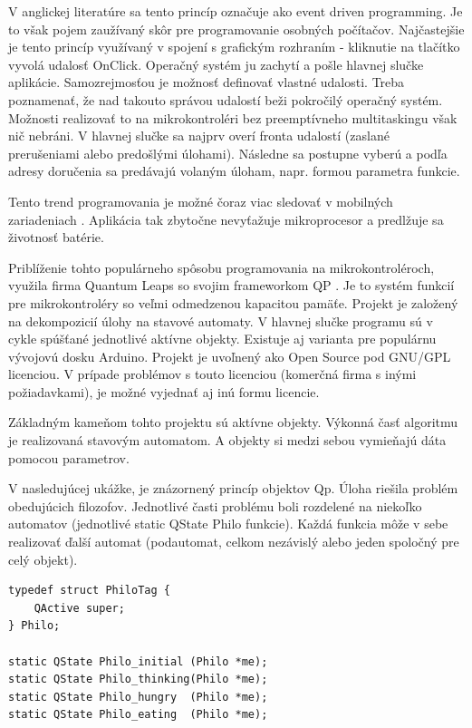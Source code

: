 V anglickej literatúre sa tento princíp označuje ako event driven programming. Je to však pojem zaužívaný skôr pre programovanie osobných počítačov. Najčastejšie je tento princíp využívaný v spojení s grafickým rozhraním - kliknutie na tlačítko vyvolá udalosť OnClick. Operačný systém ju zachytí a pošle hlavnej slučke aplikácie. Samozrejmosťou je možnosť definovať vlastné udalosti. Treba poznamenať, že nad takouto správou udalostí beži pokročilý operačný systém. Možnosti realizovať to na mikrokontroléri bez preemptívneho multitaskingu však nič nebráni. 
V hlavnej slučke sa najprv overí fronta udalostí (zaslané prerušeniami alebo predošlými úlohami). Následne sa postupne vyberú a podľa adresy doručenia sa predávajú volaným úloham, napr. formou parametra funkcie.

Tento trend programovania je možné čoraz viac sledovať v mobilných zariadeniach \cite{android_event}. Aplikácia tak zbytočne nevyťažuje mikroprocesor a predlžuje sa životnosť batérie.

Priblíženie tohto populárneho spôsobu programovania na mikrokontroléroch, využila firma Quantum Leaps so svojim frameworkom QP \cite{qp_project}. Je to systém funkcií pre mikrokontroléry so veľmi odmedzenou kapacitou pamäťe. Projekt je založený na dekompozicií úlohy na stavové automaty. V hlavnej slučke programu sú v cykle spúšťané jednotlivé aktívne objekty. Existuje aj varianta pre populárnu vývojovú dosku Arduino. Projekt je uvoľnený ako Open Source pod GNU/GPL licenciou. V prípade problémov s touto licenciou (komerčná firma s inými požiadavkami), je možné vyjednať aj inú formu licencie.

Základným kameňom tohto projektu sú aktívne objekty. Výkonná časť algoritmu je realizovaná stavovým automatom. A objekty si medzi sebou vymieňajú dáta pomocou parametrov.

V nasledujúcej ukážke, je znázornený princíp objektov Qp. Úloha riešila problém obedujúcich filozofov. Jednotlivé časti problému boli rozdelené na niekoľko automatov (jednotlivé static QState Philo funkcie). Každá funkcia môže v sebe realizovať ďalší automat (podautomat, celkom nezávislý alebo jeden spoločný pre celý objekt).

{\small
\begin{verbatim}
typedef struct PhiloTag {
    QActive super;
} Philo;

static QState Philo_initial (Philo *me);
static QState Philo_thinking(Philo *me);
static QState Philo_hungry  (Philo *me);
static QState Philo_eating  (Philo *me);
\end{verbatim}
}

